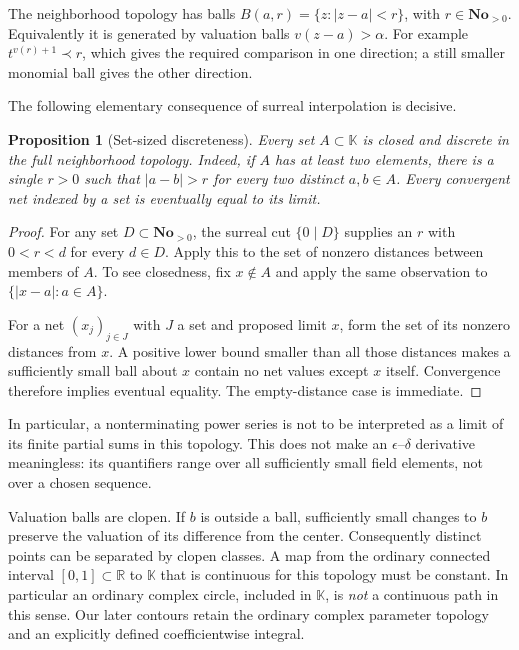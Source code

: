 \documentclass[11pt,letterpaper]{article}
\numberwithin{equation}{section}
\newtheorem{proposition}[proposition]{Proposition}
\theoremstyle{definition}
\theoremstyle{remark}
\newcommand{\No}{\mathbf{No}}
\newcommand{\K}{\mathbb K}
\newcommand{\R}{\mathbb R}
\begin{document}
The neighborhood topology has balls
$B(a,r)=\{z:|z-a|<r\}$, with $r\in\No_{>0}$.
Equivalently it is generated by valuation balls $v(z-a)>\alpha$.
For example $t^{v(r)+1}\prec r$, which gives the required comparison in
one direction; a still smaller monomial ball gives the other direction.

The following elementary consequence of surreal interpolation is decisive.

\begin{proposition}[Set-sized discreteness]\label{prop:discrete}
Every set $A\subset\K$ is closed and discrete in the full neighborhood
topology. Indeed, if $A$ has at least two elements, there is a single
$r>0$ such that $|a-b|>r$ for every two distinct $a,b\in A$.
Every convergent net indexed by a set is eventually equal to its limit.
\end{proposition}
\begin{proof}
For any set $D\subset\No_{>0}$, the surreal cut $\{0\mid D\}$ supplies
an $r$ with $0<r<d$ for every $d\in D$. Apply this to the set of nonzero
distances between members of $A$. To see closedness, fix $x\notin A$ and
apply the same observation to $\{|x-a|:a\in A\}$.

For a net $(x_j)_{j\in J}$ with $J$ a set and proposed limit $x$, form
the set of its nonzero distances from $x$. A positive lower bound smaller
than all those distances makes a sufficiently small ball about $x$
contain no net values except $x$ itself. Convergence therefore implies
eventual equality. The empty-distance case is immediate.
\end{proof}

In particular, a nonterminating power series is not to be interpreted as a
limit of its finite partial sums in this topology. This does not make an
$\epsilon$--$\delta$ derivative meaningless: its quantifiers range over
all sufficiently small field elements, not over a chosen sequence.

Valuation balls are clopen. If $b$ is outside a ball, sufficiently small
changes to $b$ preserve the valuation of its difference from the center.
Consequently distinct points can be separated by clopen classes. A map
from the ordinary connected interval $[0,1]\subset\R$ to $\K$ that is
continuous for this topology must be constant. In particular an ordinary
complex circle, included in $\K$, is \emph{not} a continuous path in this
sense. Our later contours retain the ordinary complex parameter topology
and an explicitly defined coefficientwise integral.
\end{document}
